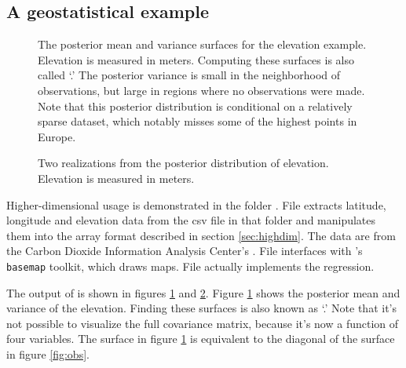 \subsection{A geostatistical example}\label{sub:geostat}
\begin{figure}
    \centering
    \caption{The posterior mean and variance surfaces for the elevation example. Elevation is measured in meters. Computing these surfaces is also called `.' The posterior variance is small in the neighborhood of observations, but large in regions where no observations were made. Note that this posterior distribution is conditional on a relatively sparse dataset, which notably misses some of the highest points in Europe.}
    \label{fig:elev}
\end{figure}
\begin{figure}
    \centering
    \caption{Two realizations from the posterior distribution of elevation. Elevation is measured in meters.}
    \label{fig:elevreal}
\end{figure}
Higher-dimensional usage is demonstrated in the folder . File  extracts latitude, longitude and elevation data from the csv file in that folder and manipulates them into the array format described in section \ref{sec:highdim}. The data are from the Carbon Dioxide Information Analysis Center's . File  interfaces with 's \texttt{basemap} toolkit, which draws maps. File  actually implements the regression.
% 

The output of  is shown in figures \ref{fig:elev} and \ref{fig:elevreal}. Figure \ref{fig:elev} shows the posterior mean and variance of the elevation. Finding these surfaces is also known as `.' Note that it's not possible to visualize the full covariance matrix, because it's now a function of four variables. The surface in figure \ref{fig:elev} is equivalent to the diagonal of the surface in figure \ref{fig:obs}.

